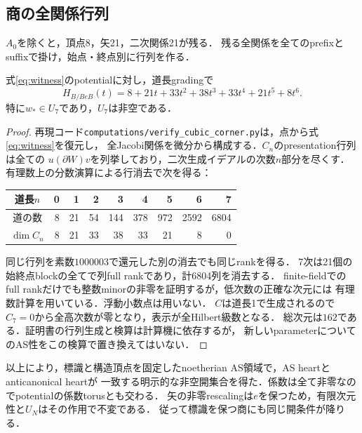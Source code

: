 \subsection{商の全関係行列}
$A_0$を除くと，頂点8，矢21，二次関係21が残る．
残る全関係を全てのprefixとsuffixで掛け，始点・終点別に行列を作る．
\begin{proposition}[厳密な有限計算]\label{prop:certificate}
式\eqref{eq:witness}のpotentialに対し，道長gradingで
\[
 H_{B/BeB}(t)=8+21t+33t^2+38t^3+33t^4+21t^5+8t^6.
\]
特に$w_*\in U_7$であり，$U_7$は非空である．
\end{proposition}
\begin{proof}
再現コード\texttt{computations/verify\_cubic\_corner.py}は，点から式\eqref{eq:witness}を復元し，
全Jacobi関係を微分から構成する．$C_n$のpresentation行列は全ての
$u(\partial W)v$を列挙しており，二次生成イデアルの次数$n$部分を尽くす．
有理数上の分数演算による行消去で次を得る：
\begin{center}
\begin{tabular}{c|rrrrrrrr}
道長$n$&0&1&2&3&4&5&6&7\\\hline
道の数&8&21&54&144&378&972&2592&6804\\
$\dim C_n$&8&21&33&38&33&21&8&0
\end{tabular}
\end{center}
同じ行列を素数$1000003$で還元した別の消去でも同じrankを得る．
7次は21個の始終点blockの全てで列full rankであり，計6804列を消去する．
finite-fieldでのfull rankだけでも整数minorの非零を証明するが，低次数の正確な次元には
有理数計算を用いている．浮動小数点は用いない．
$C$は道長1で生成されるので$C_7=0$から全高次数が零となり，表示が全Hilbert級数となる．
総次元は$162$である．証明書の行列生成と検算は計算機に依存するが，
新しいparameterについてのAS性をこの検算で置き換えてはいない．
\end{proof}

以上により，標識と構造頂点を固定したnoetherian AS領域で，AS heartとanticanonical heartが
一致する明示的な非空開集合を得た．係数は全て非零なのでpotentialの係数torusとも交わる．
矢の非零rescalingは$e$を保つため，有限次元性と$U_N$はその作用で不変である．
従って標識を保つ商にも同じ開条件が降りる．

